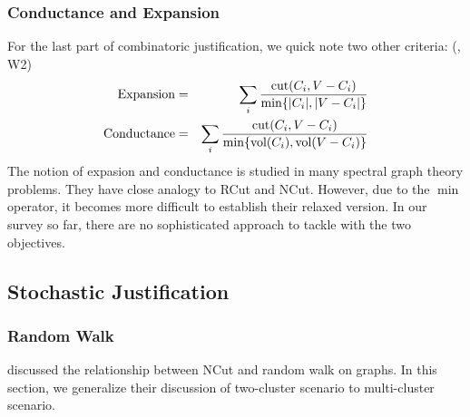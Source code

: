 \subsubsection{Conductance and Expansion}
\label{sec:conductance}

For the last part of combinatoric justification, we 
quick note two other criteria: (\cite{lau-2012-spectral-ln}, W2)
\begin{eqnarray}
	\text{Expansion} &=& \sum_{i}{\frac{\text{cut}(C_i,V-C_i)}{\min\{|C_i|,|V-C_i|\}}} \\
	\text{Conductance} &=& \sum_{i}{\frac{\text{cut}(C_i,V-C_i)}{\min\{\text{vol}(C_i),\text{vol}(V-C_i)\}}} 
\end{eqnarray}
The notion of expasion and conductance is studied in 
many spectral graph theory problems. They have close analogy 
to RCut and NCut. However, due to the $ \min $ operator, 
it becomes more difficult to establish their relaxed version. 
In our survey so far, there are no sophisticated approach 
to tackle with the two objectives. 

\subsection{Stochastic Justification}

\subsubsection{Random Walk}
\label{sec:randw}
 
\cite{maila2001random}
\cite{von2007tutorial}
discussed the relationship between NCut and 
random walk on graphs. In this section, 
we generalize their discussion of two-cluster scenario 
to multi-cluster scenario. 

